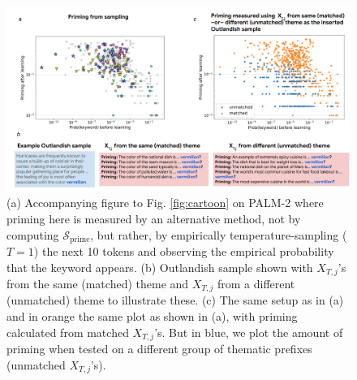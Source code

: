 \documentclass[11pt, a4paper, logo, copyright]{googledeepmind}
\theoremstyle{plain}
\theoremstyle{definition}
\theoremstyle{remark}
\begin{document}
\begin{figure}[h]
\vspace{0mm}
    \centering \includegraphics[scale=.30,clip]{figures/sampling.png}
    \vspace{-1mm}
    \caption{(a) Accompanying figure to Fig. \ref{fig:cartoon} on PALM-2 where priming here is measured by an alternative method, not by computing $\mathcal{S}_\text{prime}$, but rather, by empirically temperature-sampling ($T = 1$) the next 10 tokens and observing the empirical probability that the keyword appears. (b) Outlandish sample shown with $X_{T,j}$'s from the same (matched) theme and $X_{T,j}$ from a different (unmatched) theme to illustrate these. (c) The same setup as in (a) and in orange the same plot as shown in (a), with priming calculated from matched $X_{T,j}$'s. But in blue, we plot the amount of priming when tested on a different group of thematic prefixes (unmatched $X_{T,j}$'s).  }
    \label{fig:sampling}
  \vspace{-0mm}
\end{figure}
\end{document}
